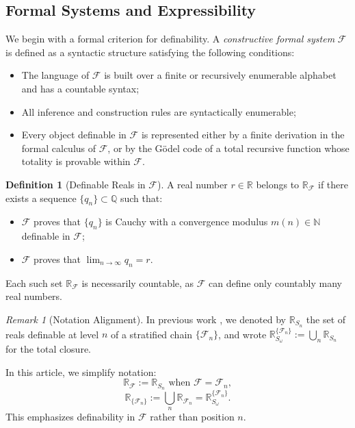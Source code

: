 \documentclass[12pt]{article}
\theoremstyle{definition}
\newtheorem{definition}{Definition}[section]
\theoremstyle{plain}
\theoremstyle{remark}
\newtheorem*{remark}{Remark}
\begin{document}
\subsection*{Formal Systems and Expressibility}

We begin with a formal criterion for definability. A \emph{constructive formal system} \( \mathcal{F} \) is defined as a syntactic structure satisfying the following conditions:
\begin{itemize}
    \item The language of \( \mathcal{F} \) is built over a finite or recursively enumerable alphabet and has a countable syntax;
    \item All inference and construction rules are syntactically enumerable;
    \item Every object definable in \( \mathcal{F} \) is represented either by a finite derivation in the formal calculus of \( \mathcal{F} \), or by the Gödel code of a total recursive function whose totality is provable within \( \mathcal{F} \).
\end{itemize}

\begin{definition}[Definable Reals in \( \mathcal{F} \)]
A real number \( r \in \mathbb{R} \) belongs to \( \mathbb{R}_{\mathcal{F}} \) if there exists a sequence \( \{ q_n \} \subset \mathbb{Q} \) such that:
\begin{itemize}
    \item \( \mathcal{F} \) proves that \( \{ q_n \} \) is Cauchy with a convergence modulus \( m(n) \in \mathbb{N} \) definable in \( \mathcal{F} \);
    \item \( \mathcal{F} \) proves that \( \lim_{n \to \infty} q_n = r \).
\end{itemize}
\end{definition}

Each such set \( \mathbb{R}_{\mathcal{F}} \) is necessarily countable, as \( \mathcal{F} \) can define only countably many real numbers.

\begin{remark}[Notation Alignment]
In previous work \cite{Semenov2025FractalOrigin}, we denoted by \( \mathbb{R}_{S_n} \) the set of reals definable at level \( n \) of a stratified chain \( \{ \mathcal{F}_n \} \), and wrote \( \mathbb{R}_{S_\omega}^{\{\mathcal{F}_n\}} := \bigcup_n \mathbb{R}_{S_n} \) for the total closure.

In this article, we simplify notation:
\[
    \mathbb{R}_{\mathcal{F}} := \mathbb{R}_{S_n} \text{ when } \mathcal{F} = \mathcal{F}_n,
\]
\[
    \mathbb{R}_{\{\mathcal{F}_n\}} := \bigcup_n \mathbb{R}_{\mathcal{F}_n} = \mathbb{R}_{S_\omega}^{\{\mathcal{F}_n\}}.
\]
This emphasizes definability in \( \mathcal{F} \) rather than position \( n \).
\end{remark}
\end{document}
